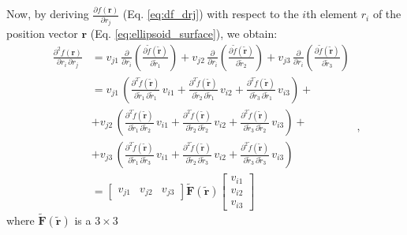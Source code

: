 \documentclass[gmd, manuscript]{copernicus}
\begin{document}
Now, by deriving $\frac{\partial f(\mathbf{r})}{\partial r_{j}}$
(Eq. \ref{eq:df_drj}) with respect to the $i$th element
$r_{i}$ of the position vector $\mathbf{r}$ (Eq. \ref{eq:ellipsoid_surface}),
we obtain:
\begin{equation}
\begin{split}
\frac{\partial^{2} f(\mathbf{r})}{\partial r_{i} \, \partial r_{j}} &=
v_{j1} \, \frac{\partial}{\partial r_{i}}
\left( \frac{\partial \tilde{f}(\tilde{\mathbf{r}})}{\partial \tilde{r}_{1}} \right) +
v_{j2} \, \frac{\partial}{\partial r_{i}}
\left( \frac{\partial \tilde{f}(\tilde{\mathbf{r}})}{\partial \tilde{r}_{2}} \right) +
v_{j3} \, \frac{\partial}{\partial r_{i}}
\left( \frac{\partial \tilde{f}(\tilde{\mathbf{r}})}{\partial \tilde{r}_{3}} \right) \\
&= v_{j1} \, \left(
\frac{\partial^{2} \tilde{f}(\tilde{\mathbf{r}})}{\partial \tilde{r}_{1} \, \partial \tilde{r}_{1}} \, v_{i1} +
\frac{\partial^{2} \tilde{f}(\tilde{\mathbf{r}})}{\partial \tilde{r}_{2} \, \partial \tilde{r}_{1}} \, v_{i2} +
\frac{\partial^{2} \tilde{f}(\tilde{\mathbf{r}})}{\partial \tilde{r}_{3} \, \partial \tilde{r}_{1}} \, v_{i3}
\right) + \\
&+ v_{j2} \, \left(
\frac{\partial^{2} \tilde{f}(\tilde{\mathbf{r}})}{\partial \tilde{r}_{1} \, \partial \tilde{r}_{2}} \, v_{i1} +
\frac{\partial^{2} \tilde{f}(\tilde{\mathbf{r}})}{\partial \tilde{r}_{2} \, \partial \tilde{r}_{2}} \, v_{i2} +
\frac{\partial^{2} \tilde{f}(\tilde{\mathbf{r}})}{\partial \tilde{r}_{3} \, \partial \tilde{r}_{2}} \, v_{i3}
\right) + \\
&+ v_{j3} \, \left(
\frac{\partial^{2} \tilde{f}(\tilde{\mathbf{r}})}{\partial \tilde{r}_{1} \, \partial \tilde{r}_{3}} \, v_{i1} +
\frac{\partial^{2} \tilde{f}(\tilde{\mathbf{r}})}{\partial \tilde{r}_{2} \, \partial \tilde{r}_{3}} \, v_{i2} +
\frac{\partial^{2} \tilde{f}(\tilde{\mathbf{r}})}{\partial \tilde{r}_{3} \, \partial \tilde{r}_{3}} \, v_{i3}
\right) \\
&= \left[ \begin{array}{ccc}
v_{j1} & v_{j2} & v_{j3}
\end{array} \right] \tilde{\mathbf{F}}(\tilde{\mathbf{r}})
\left[ \begin{array}{c}
v_{i1} \\ v_{i2} \\ v_{i3}
\end{array} \right]
\end{split} \: ,
\label{eq:d2f-dridrj}
\end{equation}
where $\tilde{\mathbf{F}}(\tilde{\mathbf{r}})$ is a $3 \times 3$
\end{document}
